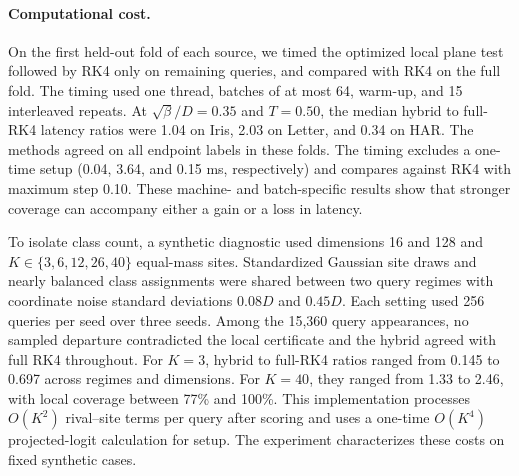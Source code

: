 \paragraph{Computational cost.}
On the first held-out fold of each source, we timed the optimized
local plane test followed by RK4 only on remaining queries, and
compared with RK4 on the full fold. The timing used one thread,
batches of at most 64, warm-up, and 15 interleaved repeats.
At $\sqrt{\beta}/D=0.35$ and $T=0.50$, the median hybrid to full-RK4
latency ratios were 1.04 on Iris, 2.03 on Letter, and 0.34 on HAR.
The methods agreed on all endpoint labels in these folds.
The timing excludes a one-time setup (0.04, 3.64, and 0.15 ms,
respectively) and compares against RK4 with maximum step 0.10.
These machine- and batch-specific results show that stronger
coverage can accompany either a gain or a loss in latency.

To isolate class count, a synthetic diagnostic used dimensions
16 and 128 and $K\in\{3,6,12,26,40\}$ equal-mass sites. Standardized
Gaussian site draws and nearly balanced class assignments were
shared between two query regimes with coordinate noise standard
deviations $0.08D$ and $0.45D$. Each setting used 256 queries per
seed over three seeds. Among the 15,360 query appearances,
no sampled departure contradicted the local certificate and the
hybrid agreed with full RK4 throughout. For $K=3$, hybrid to
full-RK4 ratios ranged from 0.145 to 0.697 across regimes and
dimensions. For $K=40$, they ranged from 1.33 to 2.46, with local
coverage between 77\% and 100\%. This implementation processes
$O(K^2)$ rival--site terms per query after scoring and uses a
one-time $O(K^4)$ projected-logit calculation for setup.
The experiment characterizes these costs on fixed synthetic cases.
